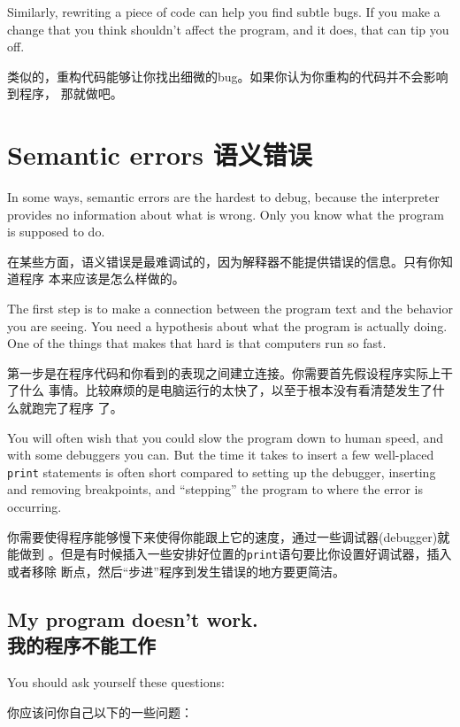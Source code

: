\documentclass[10pt]{book}
\begin{document}
\begin{CJK}{UTF8}{gbsn}
Similarly, rewriting a piece of code can help you find subtle
bugs.  If you make a change that you think shouldn't affect the
program, and it does, that can tip you off.

类似的，重构代码能够让你找出细微的bug。如果你认为你重构的代码并不会影响到程序，
那就做吧。

\section{Semantic errors 语义错误}

In some ways, semantic errors are the hardest to debug,
because the interpreter provides no information
about what is wrong.  Only you know what the program is supposed to
do.

在某些方面，语义错误是最难调试的，因为解释器不能提供错误的信息。只有你知道程序
本来应该是怎么样做的。

The first step is to make a connection between the program
text and the behavior you are seeing.  You need a hypothesis
about what the program is actually doing.  One of the things
that makes that hard is that computers run so fast.

第一步是在程序代码和你看到的表现之间建立连接。你需要首先假设程序实际上干了什么
事情。比较麻烦的是电脑运行的太快了，以至于根本没有看清楚发生了什么就跑完了程序
了。

You will often wish that you could slow the program down to human
speed, and with some debuggers you can.  But the time it takes to
insert a few well-placed {\tt print} statements is often short compared to
setting up the debugger, inserting and removing breakpoints, and
``stepping'' the program to where the error is occurring.

你需要使得程序能够慢下来使得你能跟上它的速度，通过一些调试器(debugger)就能做到
。但是有时候插入一些安排好位置的{\tt print}语句要比你设置好调试器，插入或者移除
断点，然后``步进''程序到发生错误的地方要更简洁。

\subsection{My program doesn't work.\\我的程序不能工作}

You should ask yourself these questions:

你应该问你自己以下的一些问题：

\begin{itemize}


\end{itemize}
\end{CJK}
\end{document}

